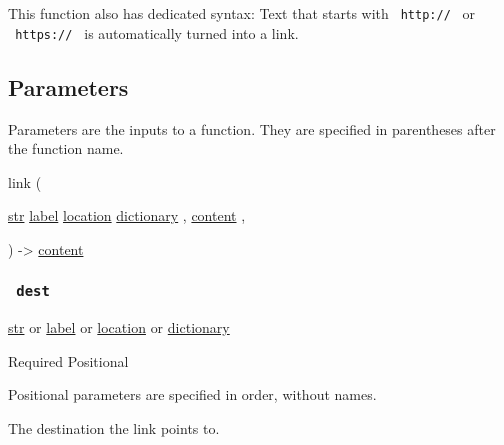 This function also has dedicated syntax: Text that starts with
\texttt{\ http://\ } or \texttt{\ https://\ } is automatically turned
into a link.

\subsection{\texorpdfstring{{ Parameters
}}{ Parameters }}\label{parameters}

\label{parameters-tooltip}
Parameters are the inputs to a function. They are specified in
parentheses after the function name.

{ link } (

{ \href{/docs/reference/foundations/str/}{str}
\href{/docs/reference/foundations/label/}{label}
\href{/docs/reference/introspection/location/}{location}
\href{/docs/reference/foundations/dictionary/}{dictionary} , } {
\href{/docs/reference/foundations/content/}{content} , }

) -\textgreater{} \href{/docs/reference/foundations/content/}{content}

\subsubsection{\texorpdfstring{\texttt{\ dest\ }}{ dest }}\label{parameters-dest}

\href{/docs/reference/foundations/str/}{str} {or}
\href{/docs/reference/foundations/label/}{label} {or}
\href{/docs/reference/introspection/location/}{location} {or}
\href{/docs/reference/foundations/dictionary/}{dictionary}

{Required} {{ Positional }}

\label{parameters-dest-positional-tooltip}
Positional parameters are specified in order, without names.

The destination the link points to.

